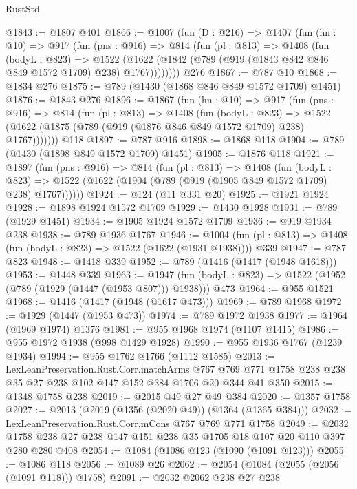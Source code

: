 \begin{lexlean}{RustStd}
\begin{coremodule}
@1843 := @1807 @401
@1866 := @1007
    (fun (D : @216) =>
    @1407
      (fun (hn : @10) =>
      @917
        (fun (pns : @916) =>
        @814
          (fun (pl : @813) =>
          @1408
            (fun (bodyL : @823) =>
            @1522 (@1622 (@1842 (@789 (@919 (@1843 @842 @846 @849 @1572 @1709) @238) @1767))))))))
    @276
@1867 := @787 @10
@1868 := @1834 @276
@1875 := @789 (@1430 (@1868 @846 @849 @1572 @1709) @1451)
@1876 := @1843 @276
@1896 := @1867
    (fun (hn : @10) =>
    @917
      (fun (pns : @916) =>
      @814
        (fun (pl : @813) =>
        @1408
          (fun (bodyL : @823) =>
          @1522 (@1622 (@1875 (@789 (@919 (@1876 @846 @849 @1572 @1709) @238) @1767)))))))
    @118
@1897 := @787 @916
@1898 := @1868 @118
@1904 := @789 (@1430 (@1898 @849 @1572 @1709) @1451)
@1905 := @1876 @118
@1921 := @1897
    (fun (pns : @916) =>
    @814
      (fun (pl : @813) =>
      @1408
        (fun (bodyL : @823) =>
        @1522 (@1622 (@1904 (@789 (@919 (@1905 @849 @1572 @1709) @238) @1767))))))
@1924 := @124 (@11 @331 @20)
@1925 := @1921 @1924
@1928 := @1898 @1924 @1572 @1709
@1929 := @1430 @1928
@1931 := @789 (@1929 @1451)
@1934 := @1905 @1924 @1572 @1709
@1936 := @919 @1934 @238
@1938 := @789 @1936 @1767
@1946 := @1004 (fun (pl : @813) => @1408 (fun (bodyL : @823) => @1522 (@1622 (@1931 @1938)))) @339
@1947 := @787 @823
@1948 := @1418 @339
@1952 := @789 (@1416 (@1417 (@1948 @1618)))
@1953 := @1448 @339
@1963 := @1947 (fun (bodyL : @823) => @1522 (@1952 (@789 (@1929 (@1447 (@1953 @807))) @1938))) @473
@1964 := @955 @1521
@1968 := @1416 (@1417 (@1948 (@1617 @473)))
@1969 := @789 @1968
@1972 := @1929 (@1447 (@1953 @473))
@1974 := @789 @1972 @1938
@1977 := @1964 (@1969 @1974) @1376
@1981 := @955 @1968 @1974 (@1107 @1415)
@1986 := @955 @1972 @1938 (@998 @1429 @1928)
@1990 := @955 @1936 @1767 (@1239 @1934)
@1994 := @955 @1762 @1766 (@1112 @1585)
@2013 := LexLeanPreservation.Rust.Corr.matchArms
    @767
    @769
    @771
    @1758
    @238
    @238
    @35
    @27
    @238
    @102
    @147
    @152
    @384
    @1706
    @20
    @344
    @41
    @350
@2015 := @1348 @1758 @238
@2019 := @2015 @49 @27 @49 @384
@2020 := @1357 @1758
@2027 := @2013 (@2019 (@1356 (@2020 @49)) (@1364 (@1365 @384)))
@2032 := LexLeanPreservation.Rust.Corr.mCons @767 @769 @771 @1758
@2049 := @2032 @1758 @238 @27 @238 @147 @151 @238 @35 @1705 @18 @107 @20 @110 @397 @280 @280 @408
@2054 := @1084 (@1086 @123 (@1090 (@1091 @123)))
@2055 := @1086 @118
@2056 := @1089 @26
@2062 := @2054 (@1084 (@2055 (@2056 (@1091 @118))) @1758)
@2091 := @2032
    @2062
    @238
    @27
    @238

\end{coremodule}
\end{lexlean}
